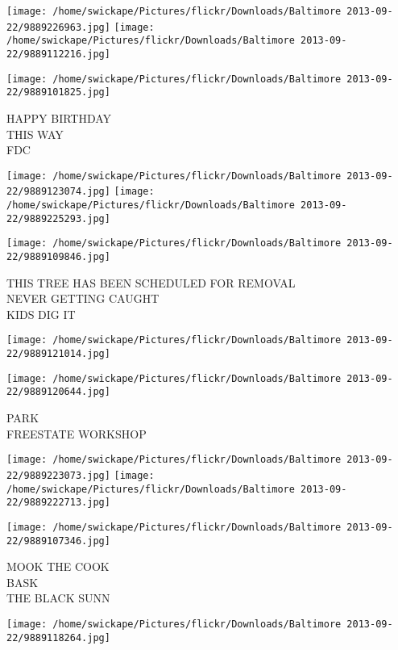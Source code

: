 \documentclass[10pt,letterpaper]{article}
\begin{document}
\texttt{[image: /home/swickape/Pictures/flickr/Downloads/Baltimore 2013-09-22/9889226963.jpg]}
\texttt{[image: /home/swickape/Pictures/flickr/Downloads/Baltimore 2013-09-22/9889112216.jpg]}

\vspace{0.25in}
\texttt{[image: /home/swickape/Pictures/flickr/Downloads/Baltimore 2013-09-22/9889101825.jpg]}

HAPPY BIRTHDAY\\
THIS WAY\\
FDC\\
\pagebreak

\texttt{[image: /home/swickape/Pictures/flickr/Downloads/Baltimore 2013-09-22/9889123074.jpg]}
\texttt{[image: /home/swickape/Pictures/flickr/Downloads/Baltimore 2013-09-22/9889225293.jpg]}

\texttt{[image: /home/swickape/Pictures/flickr/Downloads/Baltimore 2013-09-22/9889109846.jpg]}

THIS TREE HAS BEEN SCHEDULED FOR REMOVAL\\
NEVER GETTING CAUGHT\\
KIDS DIG IT\\
\pagebreak

\texttt{[image: /home/swickape/Pictures/flickr/Downloads/Baltimore 2013-09-22/9889121014.jpg]}

\vspace{0.25in}
\texttt{[image: /home/swickape/Pictures/flickr/Downloads/Baltimore 2013-09-22/9889120644.jpg]}

PARK\\
FREESTATE WORKSHOP\\
\pagebreak

\texttt{[image: /home/swickape/Pictures/flickr/Downloads/Baltimore 2013-09-22/9889223073.jpg]}
\texttt{[image: /home/swickape/Pictures/flickr/Downloads/Baltimore 2013-09-22/9889222713.jpg]}

\texttt{[image: /home/swickape/Pictures/flickr/Downloads/Baltimore 2013-09-22/9889107346.jpg]}

MOOK THE COOK\\
BASK\\
THE BLACK SUNN\\
\pagebreak

\texttt{[image: /home/swickape/Pictures/flickr/Downloads/Baltimore 2013-09-22/9889118264.jpg]}
\end{document}
